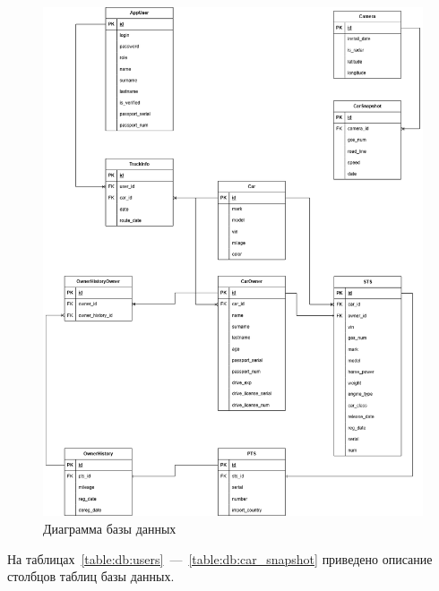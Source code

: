 \begin{figure}[H]
    \centering
    \includegraphics[width=1\linewidth]{images/diograms/tables.png}
    \caption{Диаграмма базы данных}
    \label{fig:tables}
\end{figure}


На таблицах~\ref{table:db:users}~---~\ref{table:db:car_snapshot} приведено описание столбцов таблиц базы данных.

